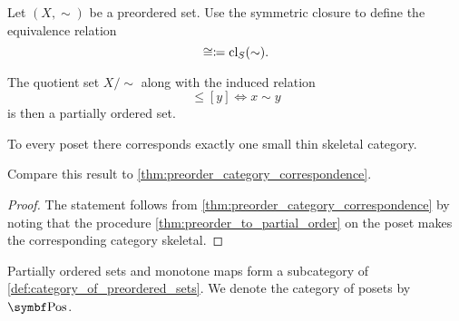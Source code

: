\begin{proposition}\label{thm:preorder_to_partial_order}
  Let \( (X, \sim) \) be a preordered set. Use the symmetric closure to define the equivalence relation
  \begin{equation*}
    \cong \coloneqq \operatorname{cl}_S(\sim).
  \end{equation*}

  The quotient set \( X / \sim \) along with the induced relation
  \begin{equation*}
    [x] \leq [y] \iff x \sim y
  \end{equation*}
  is then a partially ordered set.
\end{proposition}

\begin{proposition}\label{thm:partial_order_category_correspondence}
  To every poset there corresponds exactly one small thin skeletal category.

  Compare this result to \cref{thm:preorder_category_correspondence}.
\end{proposition}
\begin{proof}
  The statement follows from \cref{thm:preorder_category_correspondence} by noting that the procedure \cref{thm:preorder_to_partial_order} on the poset makes the corresponding category skeletal.
\end{proof}

\begin{definition}\label{def:category_of_posets}
  Partially ordered sets and monotone maps form a subcategory of \cref{def:category_of_preordered_sets}. We denote the category of posets by \( \Cat{Pos} \).
\end{definition}
